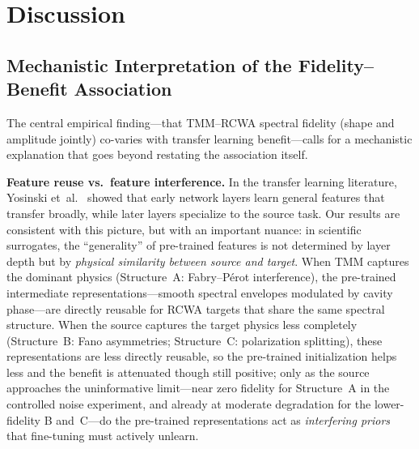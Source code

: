 \documentclass[a4paper,fleqn]{cas-sc}
\begin{document}
\section{Discussion}
\label{sec:discussion}

\subsection{Mechanistic Interpretation of the Fidelity--Benefit Association}

The central empirical finding---that TMM--RCWA spectral fidelity (shape and amplitude jointly) co-varies with transfer learning benefit---calls for a mechanistic explanation that goes beyond restating the association itself.

\textbf{Feature reuse vs.\ feature interference.} In the transfer learning literature, Yosinski et~al.~\cite{yosinski2014transferable} showed that early network layers learn general features that transfer broadly, while later layers specialize to the source task. Our results are consistent with this picture, but with an important nuance: in scientific surrogates, the ``generality'' of pre-trained features is not determined by layer depth but by \emph{physical similarity between source and target}. When TMM captures the dominant physics (Structure~A: Fabry--P\'{e}rot interference), the pre-trained intermediate representations---smooth spectral envelopes modulated by cavity phase---are directly reusable for RCWA targets that share the same spectral structure. When the source captures the target physics less completely (Structure~B: Fano asymmetries; Structure~C: polarization splitting), these representations are less directly reusable, so the pre-trained initialization helps less and the benefit is attenuated though still positive; only as the source approaches the uninformative limit---near zero fidelity for Structure~A in the controlled noise experiment, and already at moderate degradation for the lower-fidelity B and~C---do the pre-trained representations act as \emph{interfering priors} that fine-tuning must actively unlearn.
\end{document}
